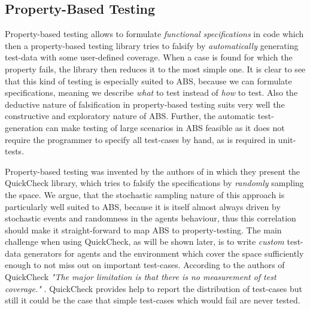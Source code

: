 \subsection{Property-Based Testing}
Property-based testing allows to formulate \textit{functional specifications} in code which then a property-based testing library tries to falsify by \textit{automatically} generating test-data with some user-defined coverage. When a case is found for which the property fails, the library then reduces it to the most simple one. It is clear to see that this kind of testing is especially suited to ABS, because we can formulate specifications, meaning we describe \textit{what} to test instead of \textit{how} to test. Also the deductive nature of falsification in property-based testing suits very well the constructive and exploratory nature of ABS. Further, the automatic test-generation can make testing of large scenarios in ABS feasible as it does not require the programmer to specify all test-cases by hand, as is required in unit-tests.

Property-based testing was invented by the authors of \cite{claessen_quickcheck_2000,claessen_testing_2002} in which they present the QuickCheck library, which tries to falsify the specifications by \textit{randomly} sampling the space. We argue, that the stochastic sampling nature of this approach is particularly well suited to ABS, because it is itself almost always driven by stochastic events and randomness in the agents behaviour, thus this correlation should make it straight-forward to map ABS to property-testing. The main challenge when using QuickCheck, as will be shown later, is to write \textit{custom} test-data generators for agents and the environment which cover the space sufficiently enough to not miss out on important test-cases. According to the authors of QuickCheck \textit{"The major limitation is that there is no measurement of test coverage."} \cite{claessen_quickcheck_2000}. QuickCheck provides help to report the distribution of test-cases but still it could be the case that simple test-cases which would fail are never tested.

